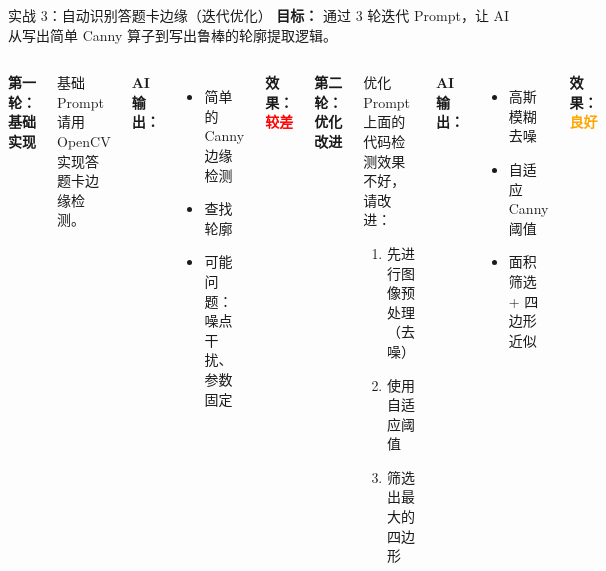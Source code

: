 
\begin{frame}{实战 3：自动识别答题卡边缘（迭代优化）}
	\textbf{目标：} 通过 3 轮迭代 Prompt，让 AI 从写出简单 Canny 算子到写出鲁棒的轮廓提取逻辑。

	\vspace{0.3cm}

	\begin{columns}
		\textbf{第一轮：基础实现}

		\begin{alertblock}{基础 Prompt}
			请用 OpenCV 实现答题卡边缘检测。
		\end{alertblock}

		\textbf{AI 输出：}
		\begin{itemize}
			\item 简单的 Canny 边缘检测
			\item 查找轮廓
			\item 可能问题：噪点干扰、参数固定
		\end{itemize}

		\textbf{效果：}\textcolor{red}{\textbf{较差}}

		\textbf{第二轮：优化改进}

		\begin{exampleblock}{优化 Prompt}
			上面的代码检测效果不好，请改进：
			\begin{enumerate}
				\item 先进行图像预处理（去噪）
				\item 使用自适应阈值
				\item 筛选出最大的四边形
			\end{enumerate}
		\end{exampleblock}

		\textbf{AI 输出：}
		\begin{itemize}
			\item 高斯模糊去噪
			\item 自适应 Canny 阈值
			\item 面积筛选 + 四边形近似
		\end{itemize}

		\textbf{效果：}\textcolor{orange}{\textbf{良好}}
	\end{columns}
\end{frame}

